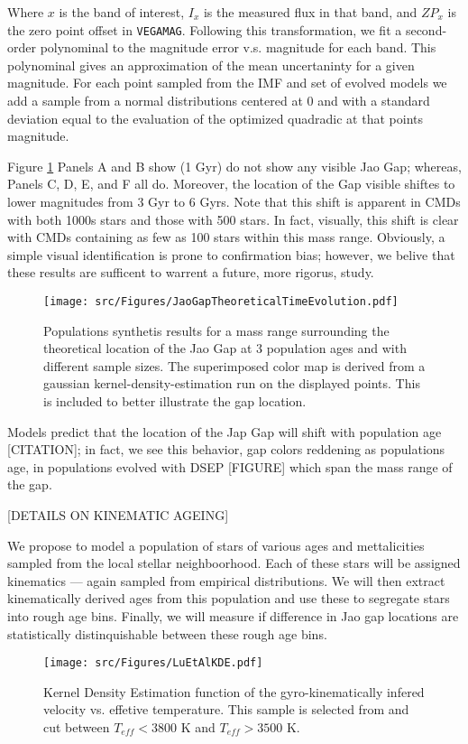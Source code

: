Where $x$ is the band of interest, $I_{x}$ is the measured flux in that band,
and $ZP_{x}$ is the zero point offset in \texttt{VEGAMAG}. Following this
transformation, we fit a second-order polynominal to the magnitude error v.s.
magnitude for each band. This polynominal gives an approximation of the mean
uncertaninty for a given magnitude. For each point sampled from the IMF and set
of evolved models we add a sample from a normal distributions centered at 0 and
with a standard deviation equal to the evaluation of the optimized quadradic at
that points magnitude.

Figure \ref{fig:JGTTE} Panels A and B show (1 Gyr) do not show any visible Jao
Gap; whereas, Panels C, D, E, and F all do. Moreover, the location of the Gap
visible shiftes to lower magnitudes from 3 Gyr to 6 Gyrs. Note that this shift
is apparent in CMDs with both 1000s stars and those with 500 stars. In fact,
visually, this shift is clear with CMDs containing as few as 100 stars within
this mass range. Obviously, a simple visual identification is prone to
confirmation bias; however, we belive that these results are sufficent to
warrent a future, more rigorus, study.


\begin{figure}
	\centering
	\texttt{[image: src/Figures/JaoGapTheoreticalTimeEvolution.pdf]}
	\caption{Populations synthetis results for a mass range surrounding the
	theoretical location of the Jao Gap at 3 population ages and with different
	sample sizes. The superimposed color map is derived from a gaussian
	kernel-density-estimation run on the displayed points. This is included to
	better illustrate the gap location.}
	\label{fig:JGTTE}
\end{figure}


Models predict that the location of the Jap Gap will shift with population age
[CITATION]; in fact, we see this behavior, gap colors reddening as populations
age, in populations evolved with DSEP [FIGURE] which span the mass range of the
gap.

[DETAILS ON KINEMATIC AGEING]

We propose to model a population of stars of various ages and mettalicities
sampled from the local stellar neighboorhood. Each of these stars will be
assigned kinematics --- again sampled from empirical distributions. We will
then extract kinematically derived ages from this population and use these to
segregate stars into rough age bins. Finally, we will measure if difference in
Jao gap locations are statistically distinquishable between these rough age bins.

\begin{figure}
	\centering
	\texttt{[image: src/Figures/LuEtAlKDE.pdf]}
	\caption{Kernel Density Estimation function of the gyro-kinematically
	infered velocity vs. effetive temperature. This sample is selected from
	\citet{Lu2021} and cut between $T_{eff} < 3800$ K and $T_{eff} > 3500$ K.}
	\label{fig:LuKde}
\end{figure}
